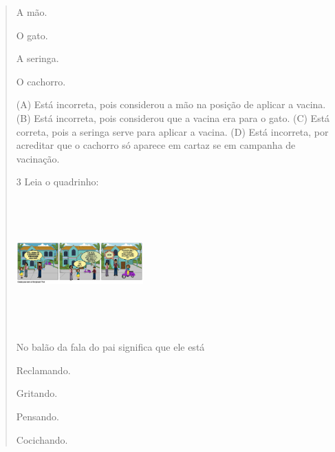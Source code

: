 \begin{verse}
\begin{minipage}{.5\textwidth}
\begin{escolha}
\item A mão.

\item O gato.

\item A seringa.

\item O cachorro.
\end{escolha}
\end{minipage}

(A) Está incorreta, pois considerou a mão na posição de aplicar a vacina.
(B) Está incorreta, pois considerou que a vacina era para o gato.
(C) Está correta, pois a seringa serve para aplicar a vacina.
(D) Está incorreta, por acreditar que o cachorro só aparece em cartaz se
em campanha de vacinação.

\num{3} Leia o quadrinho:

\includegraphics[width=1.92014in,height=1.95486in]{media/image138.png}

No balão da fala do pai significa que ele está

\begin{minipage}{.5\textwidth}
\begin{escolha}
\item Reclamando.

\item Gritando.

\item Pensando.

\item Cocichando.
\end{escolha}
\end{minipage}
\end{verse}
